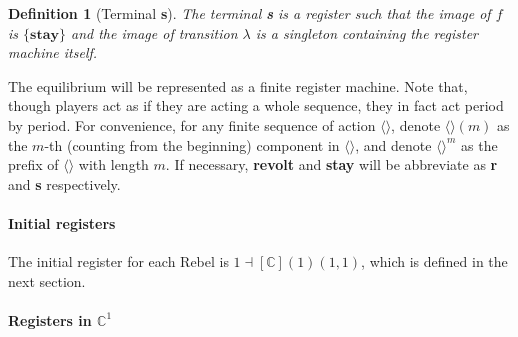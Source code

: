 \documentclass[12pt,letter]{article}
\newcommand{\Kappa}{\mathbb{C}}
\newtheorem{definition}{Definition}[section]
\theoremstyle{definition}
\theoremstyle{remark}
\theoremstyle{claim}
\begin{document}
\begin{definition}[Terminal \textbf{s}]
The terminal \textbf{s} is a register such that the image of $f$ is $\{\textbf{stay}\}$ and the image of transition $\lambda$ is a singleton containing the register machine itself. 
\end{definition}

The equilibrium will be represented as a {finite register machine}. Note that, though players act as if they are acting a whole sequence, they in fact act period by period. For convenience, for any finite sequence of action $\langle \rangle$, denote $\langle \rangle(m)$ as the $m$-th (counting from the beginning) component in $\langle \rangle$, and denote $\langle \rangle^m$ as the prefix of $\langle \rangle$ with length $m$. If necessary, \textbf{revolt} and \textbf{stay} will be abbreviate as \textbf{r} and \textbf{s} respectively. 

\paragraph{Initial registers}
The initial register for each Rebel is $1\dashv[\Kappa](1)(1,1)$, which is defined in the next section.
\paragraph{Registers in $\Kappa^1$}
\end{document}
